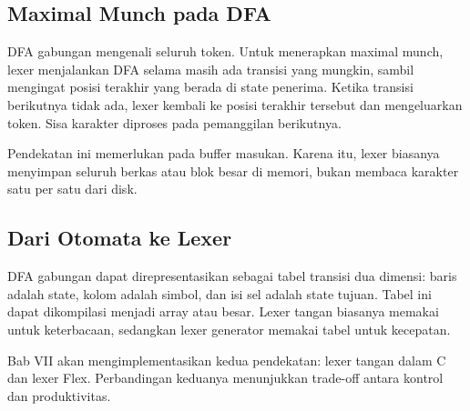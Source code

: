 \subsection{Maximal Munch pada DFA}

DFA gabungan mengenali seluruh token. Untuk menerapkan maximal munch,
lexer menjalankan DFA selama masih ada transisi yang mungkin, sambil
mengingat posisi terakhir yang berada di state penerima. Ketika
transisi berikutnya tidak ada, lexer kembali ke posisi terakhir
tersebut dan mengeluarkan token. Sisa karakter diproses pada
pemanggilan berikutnya.

Pendekatan ini memerlukan  pada buffer masukan. Karena
itu, lexer biasanya menyimpan seluruh berkas atau blok besar di
memori, bukan membaca karakter satu per satu dari disk.

\subsection{Dari Otomata ke Lexer}

DFA gabungan dapat direpresentasikan sebagai tabel transisi
dua dimensi: baris adalah state, kolom adalah simbol, dan isi sel
adalah state tujuan. Tabel ini dapat dikompilasi menjadi array atau
 besar. Lexer tangan biasanya memakai 
untuk keterbacaan, sedangkan lexer generator memakai tabel untuk
kecepatan.

Bab VII akan mengimplementasikan kedua pendekatan: lexer tangan
dalam C dan lexer Flex. Perbandingan keduanya menunjukkan trade-off
antara kontrol dan produktivitas.
